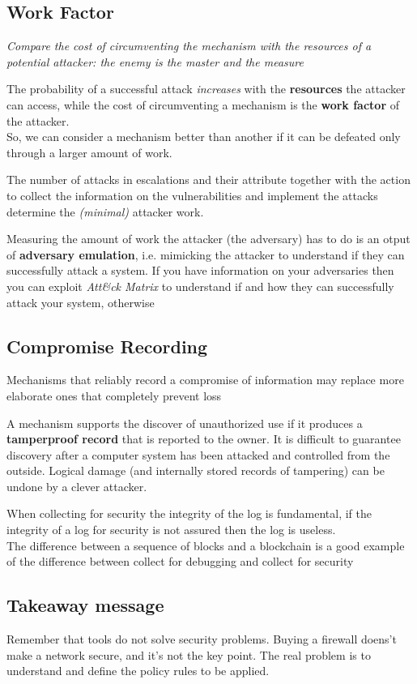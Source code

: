 \subsection{Work Factor}
\begin{center}
   \textit{Compare the cost of circumventing the mechanism with the resources
   of a potential attacker:
   the enemy is the master and the measure}
\end{center}

The probability of a successful attack \textit{increases} with the \textbf{resources} the attacker can access,
while the cost of circumventing a mechanism is the \textbf{work factor} of the attacker.\\
So, we can consider a mechanism better than another if it can be defeated only through a larger amount of work.

The number of attacks in escalations and their attribute together with the action to collect the information on the vulnerabilities and implement the attacks determine the \textit{(minimal)} attacker work.

Measuring the amount of work the attacker (the adversary) has to do is an otput of \textbf{adversary emulation}, i.e. mimicking the attacker to understand if they can successfully attack a system.
If you have information on your adversaries then you can exploit \textit{Att\&ck Matrix} to understand if and
how they can successfully attack your system,
otherwise

\subsection{Compromise Recording}
\begin{center}
   Mechanisms that reliably record a compromise of information may replace more elaborate ones that completely prevent loss
\end{center}
A mechanism supports the discover of unauthorized use if it produces a \textbf{tamperproof record} that is reported to the owner.
It is difficult to guarantee discovery after a computer system has been attacked and controlled from the outside.
Logical damage (and internally stored records of tampering) can be undone by a clever attacker.

When collecting for security the integrity of the log is
fundamental, if the integrity of a log for security is not assured then the
log is useless.\\
The difference between a sequence of blocks and a
blockchain is a good example of the difference between
collect for debugging and collect for security

\subsection{Takeaway message}
Remember that tools do not solve security problems.
Buying a firewall doens't make a network secure, and it's not the key point.
The real problem is to understand and define the policy rules to be applied.